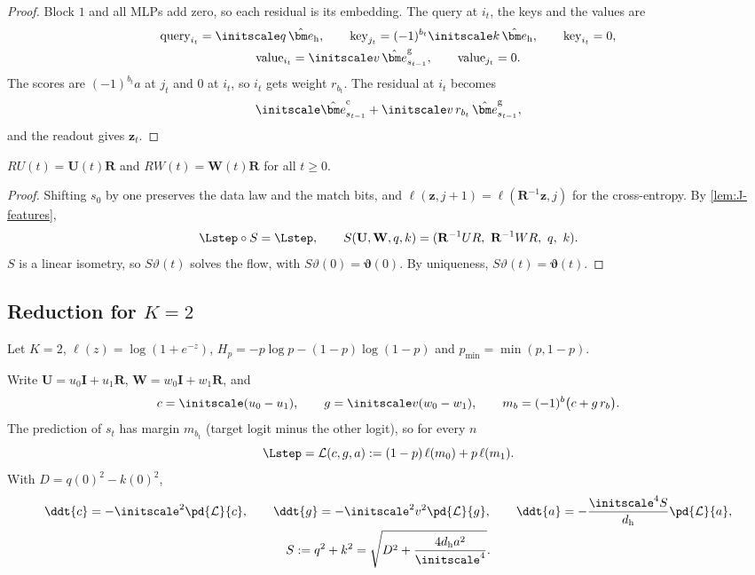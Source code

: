 \begin{proof}
Block $1$ and all MLPs add zero, so each residual is its embedding. The query at $i_t$, the keys and the values are
\begin{gather*}
 \text{query}_{i_t}=\initscale q\,\hat{\bm e}_{\mathrm h},\qquad \text{key}_{j_t}=(-1)^{b_t}\initscale k\,\hat{\bm e}_{\mathrm h},\qquad \text{key}_{i_t}=0,\\
 \text{value}_{i_t}=\initscale v\,\hat{\bm e}^{\mathrm g}_{s_{t-1}},\qquad \text{value}_{j_t}=0 .
\end{gather*}
The scores are $(-1)^{b_t}a$ at $j_t$ and $0$ at $i_t$, so $i_t$ gets weight $r_{b_t}$. The residual at $i_t$ becomes
\[
 \initscale\hat{\bm e}^{\mathrm c}_{s_{t-1}}+\initscale v\,r_{b_t}\,\hat{\bm e}^{\mathrm g}_{s_{t-1}},
\]
and the readout gives $\bm z_t$.
\end{proof}

\begin{lemma}
\label{lem:J-symmetry}
$RU(t)=\mathbf U(t)\mathbf R$ and $RW(t)=\mathbf W(t)\mathbf R$ for all $t\ge0$.
\end{lemma}

\begin{proof}
Shifting $s_0$ by one preserves the data law and the match bits, and $\ell(\bm z,j+1)=\ell(\mathbf R^{-1}\bm z,j)$ for the cross-entropy. By \cref{lem:J-features},
\[
 \Lstep\circ S=\Lstep,\qquad S(\mathbf U,\mathbf W,q,k)=(\mathbf R^{-1}UR,\ \mathbf R^{-1}WR,\ q,\ k).
\]
$S$ is a linear isometry, so $S\vartheta(t)$ solves the flow, with $S\vartheta(0)=\bm\vartheta(0)$. By uniqueness, $S\vartheta(t)=\bm\vartheta(t)$.
\end{proof}

\subsection{Reduction for \texorpdfstring{$K=2$}{K = 2}}

Let $K=2$, $\ell(z)=\log(1+e^{-z})$, $H_p=-p\log p-(1-p)\log(1-p)$ and $p_{\min}=\min(p,1-p)$.

\begin{lemma}
\label{lem:J-reduce}
Write $\mathbf U=u_0\mathbf I+u_1\mathbf R$, $\mathbf W=w_0\mathbf I+w_1\mathbf R$, and
\[
 c=\initscale(u_0-u_1),\qquad g=\initscale v(w_0-w_1),\qquad m_b=(-1)^b\bigl(c+g\,r_b\bigr).
\]
The prediction of $s_t$ has margin $m_{b_t}$ (target logit minus the other logit), so for every $n$
\[
 \Lstep=\mathcal L(c,g,a):=(1-p)\,\ell(m_0)+p\,\ell(m_1).
\]
With $D=q(0)^2-k(0)^2$,
\begin{equation}
 \begin{gathered}
 \ddt{c}=-\initscale^2\pd{\mathcal L}{c},\qquad \ddt{g}=-\initscale^2v^2\pd{\mathcal L}{g},\qquad \ddt{a}=-\frac{\initscale^4S}{d_{\mathrm h}}\pd{\mathcal L}{a},\\
 S:=q^2+k^2=\sqrt{D^2+\frac{4d_{\mathrm h}a^2}{\initscale^4}}.
 \end{gathered}
 \label{eq:J-flow}
\end{equation}
\end{lemma}

